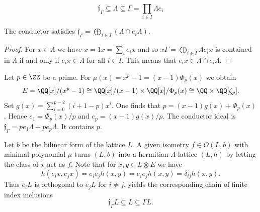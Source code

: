  \begin{equation}\label{eqn:sandwich_ring}
 \mathfrak{f}_{\Gamma} \subseteq \Lambda \subseteq \Gamma = \prod_{i\in I} \Lambda e_i
 \end{equation}

%
\begin{lemma}
 The conductor satisfies $\mathfrak{f}_\Gamma = \bigoplus_{i \in I} (\Lambda \cap e_i \Lambda)$.
\end{lemma}

\begin{proof}
  For $x \in \Lambda$ we have $x = 1 x = \sum_i e_i x$ and so $x \Gamma = \bigoplus_{i \in I} \Lambda e_i x$ is contained in $\Lambda$ if and only if $e_i x \in \Lambda$ for all $i\in I$. This means that $e_i x \in \Lambda \cap e_i \Lambda$.
\end{proof}

\begin{example}\label{ex:conductor}
 Let $p \in \ZZ$ be a prime. For $\mu(x) = x^p-1 = (x-1)\Phi_p(x)$
 we obtain
 \[E = \QQ[x] / (x^p-1) \cong \QQ[x]/(x-1) \times \QQ[x]/\Phi_p(x) \cong \QQ \times \QQ[\zeta_p].\]
 Set $g(x) = \sum_{i=0}^{p-2}(i+1-p)x^i$.
 One finds that $p = (x-1)g(x) + \Phi_p(x)$.
 Hence $e_1=\Phi_p(x)/p$ and $e_p = (x-1)g(x)/p$.
 The conductor ideal is $\mathfrak{f}_\Gamma=p e_1 \Lambda + p e_p \Lambda$. It contains $p$.
\end{example}
Let $b$ be the bilinear form of the lattice $L$.
A given isometry $f\in O(L,b)$ with minimal polynomial $\mu$
turns $(L,b)$ into a hermitian $\Lambda$-lattice $(L,h)$ by letting the class of $x$ act as $f$.
Note that for $x,y \in L\otimes E$ we have
\[h(e_i x, e_j x) = e_i \bar e_j h(x,y) = e_i e_j h(x,y) = \delta_{ij} h(x,y).\]
Thus $e_i L$ is orthogonal to $e_j L$ for $i\neq j$.
yields the corresponding chain of finite index inclusions
\begin{equation}\label{eqn:sandwich}
\mathfrak{f}_{\Gamma}L \subseteq L \subseteq \Gamma L.
\end{equation}

